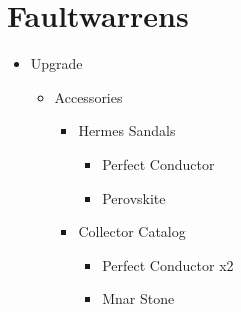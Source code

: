 \chapter{Faultwarrens}

\begin{upgrade}
	\begin{itemize}
		\item Upgrade
			\begin{itemize}
				\item Accessories
					\begin{itemize}
						\item Hermes Sandals
							\begin{itemize}
								\item Perfect Conductor
								\item Perovskite
							\end{itemize}
						\item Collector Catalog
							\begin{itemize}
								\item Perfect Conductor x2
								\item Mnar Stone
							\end{itemize}
					\end{itemize}
			\end{itemize}
	\end{itemize}
\end{upgrade}

